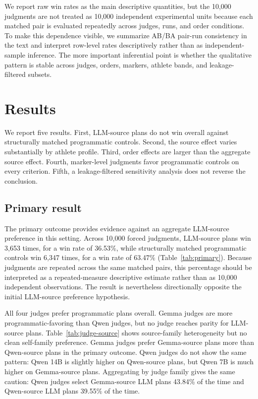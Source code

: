 \documentclass[11pt]{article}
\begin{document}
We report raw win rates as the main descriptive quantities, but the 10,000 judgments are not treated as 10,000 independent experimental units because each matched pair is evaluated repeatedly across judges, runs, and order conditions. To make this dependence visible, we summarize AB/BA pair-run consistency in the text and interpret row-level rates descriptively rather than as independent-sample inference. The more important inferential point is whether the qualitative pattern is stable across judges, orders, markers, athlete bands, and leakage-filtered subsets.

\section{Results}

We report five results. First, LLM-source plans do not win overall against structurally matched programmatic controls. Second, the source effect varies substantially by athlete profile. Third, order effects are larger than the aggregate source effect. Fourth, marker-level judgments favor programmatic controls on every criterion. Fifth, a leakage-filtered sensitivity analysis does not reverse the conclusion.

\subsection{Primary result}

The primary outcome provides evidence against an aggregate LLM-source preference in this setting. Across 10,000 forced judgments, LLM-source plans win 3,653 times, for a win rate of 36.53\%, while structurally matched programmatic controls win 6,347 times, for a win rate of 63.47\% (Table~\ref{tab:primary}). Because judgments are repeated across the same matched pairs, this percentage should be interpreted as a repeated-measure descriptive estimate rather than as 10,000 independent observations. The result is nevertheless directionally opposite the initial LLM-source preference hypothesis.

All four judges prefer programmatic plans overall. Gemma judges are more programmatic-favoring than Qwen judges, but no judge reaches parity for LLM-source plans. Table~\ref{tab:judge-source} shows source-family heterogeneity but no clean self-family preference. Gemma judges prefer Gemma-source plans more than Qwen-source plans in the primary outcome. Qwen judges do not show the same pattern: Qwen 14B is slightly higher on Qwen-source plans, but Qwen 7B is much higher on Gemma-source plans. Aggregating by judge family gives the same caution: Qwen judges select Gemma-source LLM plans 43.84\% of the time and Qwen-source LLM plans 39.55\% of the time.
\end{document}
